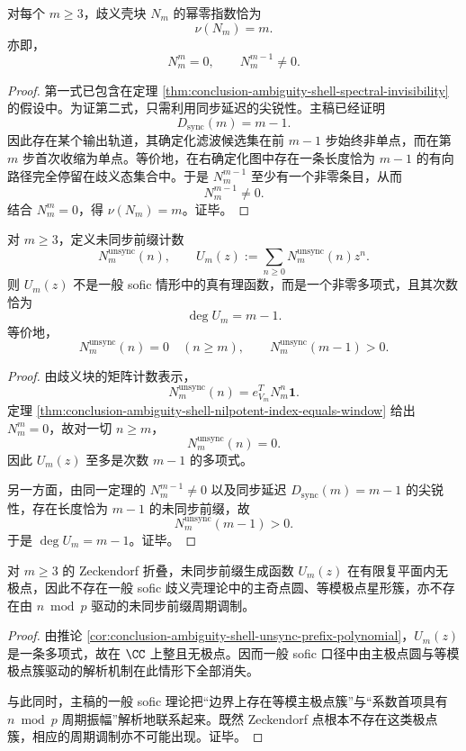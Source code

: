 \begin{theorem}[歧义壳的幂零指数恰等于窗口长度]\label{thm:conclusion-ambiguity-shell-nilpotent-index-equals-window}
对每个 \(m\ge 3\)，歧义壳块 \(N_m\) 的幂零指数恰为
\[
\nu(N_m)=m.
\]
亦即，
\[
N_m^m=0,\qquad N_m^{m-1}\neq 0.
\]
\end{theorem}
\begin{proof}
第一式已包含在定理 \ref{thm:conclusion-ambiguity-shell-spectral-invisibility} 的假设中。为证第二式，只需利用同步延迟的尖锐性。主稿已经证明
\[
D_{\mathrm{sync}}(m)=m-1.
\]
因此存在某个输出轨道，其确定化滤波候选集在前 \(m-1\) 步始终非单点，而在第 \(m\) 步首次收缩为单点。等价地，在右确定化图中存在一条长度恰为 \(m-1\) 的有向路径完全停留在歧义态集合中。于是 \(N_m^{m-1}\) 至少有一个非零条目，从而
\[
N_m^{m-1}\neq 0.
\]
结合 \(N_m^m=0\)，得 \(\nu(N_m)=m\)。证毕。
\end{proof}

\begin{corollary}[未同步前缀生成函数的多项式退化]\label{cor:conclusion-ambiguity-shell-unsync-prefix-polynomial}
对 \(m\ge 3\)，定义未同步前缀计数
\[
N_m^{\mathrm{unsync}}(n),
\qquad
U_m(z):=\sum_{n\ge 0}N_m^{\mathrm{unsync}}(n)z^n.
\]
则 \(U_m(z)\) 不是一般 sofic 情形中的真有理函数，而是一个非零多项式，且其次数恰为
\[
\deg U_m=m-1.
\]
等价地，
\[
N_m^{\mathrm{unsync}}(n)=0\quad (n\ge m),
\qquad
N_m^{\mathrm{unsync}}(m-1)>0.
\]
\end{corollary}
\begin{proof}
由歧义块的矩阵计数表示，
\[
N_m^{\mathrm{unsync}}(n)=e_{V_m}^{T}N_m^n\mathbf 1.
\]
定理 \ref{thm:conclusion-ambiguity-shell-nilpotent-index-equals-window} 给出 \(N_m^m=0\)，故对一切 \(n\ge m\)，
\[
N_m^{\mathrm{unsync}}(n)=0.
\]
因此 \(U_m(z)\) 至多是次数 \(m-1\) 的多项式。

另一方面，由同一定理的 \(N_m^{m-1}\neq 0\) 以及同步延迟 \(D_{\mathrm{sync}}(m)=m-1\) 的尖锐性，存在长度恰为 \(m-1\) 的未同步前缀，故
\[
N_m^{\mathrm{unsync}}(m-1)>0.
\]
于是 \(\deg U_m=m-1\)。证毕。
\end{proof}

\begin{theorem}\label{thm:conclusion-zeckendorf-ambiguity-shell-pole-star-collapse}
对 \(m\ge 3\) 的 Zeckendorf 折叠，未同步前缀生成函数 \(U_m(z)\) 在有限复平面内无极点，因此不存在一般 sofic 歧义壳理论中的主奇点圆、等模极点星形簇，亦不存在由 \(n\bmod p\) 驱动的未同步前缀周期调制。
\end{theorem}
\begin{proof}
由推论 \ref{cor:conclusion-ambiguity-shell-unsync-prefix-polynomial}，\(U_m(z)\) 是一条多项式，故在 \(\CC\) 上整且无极点。因而一般 sofic 口径中由主极点圆与等模极点簇驱动的解析机制在此情形下全部消失。

与此同时，主稿的一般 sofic 理论把“边界上存在等模主极点簇”与“系数首项具有 \(n\bmod p\) 周期振幅”解析地联系起来。既然 Zeckendorf 点根本不存在这类极点簇，相应的周期调制亦不可能出现。证毕。
\end{proof}


